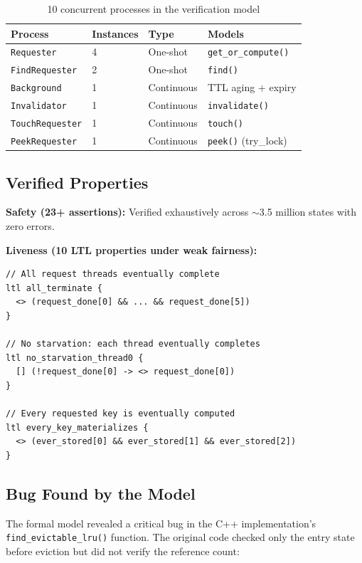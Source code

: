 \documentclass[11pt,a4paper]{article}
\begin{document}
\begin{table}[htbp]
\centering
\begin{tabular}{@{}llll@{}}
\toprule
Process & Instances & Type & Models \\
\midrule
\texttt{Requester} & 4 & One-shot & \texttt{get\_or\_compute()} \\
\texttt{FindRequester} & 2 & One-shot & \texttt{find()} \\
\texttt{Background} & 1 & Continuous & TTL aging + expiry \\
\texttt{Invalidator} & 1 & Continuous & \texttt{invalidate()} \\
\texttt{TouchRequester} & 1 & Continuous & \texttt{touch()} \\
\texttt{PeekRequester} & 1 & Continuous & \texttt{peek()} (try\_lock) \\
\bottomrule
\end{tabular}
\caption{10 concurrent processes in the verification model}
\end{table}

\subsection{Verified Properties}

\textbf{Safety (23+ assertions):} Verified exhaustively across $\sim$3.5
million states with zero errors.

\textbf{Liveness (10 LTL properties under weak fairness):}

\begin{lstlisting}[language=Promela, caption=Key LTL properties]
// All request threads eventually complete
ltl all_terminate {
  <> (request_done[0] && ... && request_done[5])
}

// No starvation: each thread eventually completes
ltl no_starvation_thread0 {
  [] (!request_done[0] -> <> request_done[0])
}

// Every requested key is eventually computed
ltl every_key_materializes {
  <> (ever_stored[0] && ever_stored[1] && ever_stored[2])
}
\end{lstlisting}

\subsection{Bug Found by the Model}
\label{sec:bug-found}

The formal model revealed a critical bug in the C++ implementation's
\texttt{find\_evictable\_lru()} function.  The original code checked
only the entry state before eviction but did not verify the reference
count:
\end{document}
